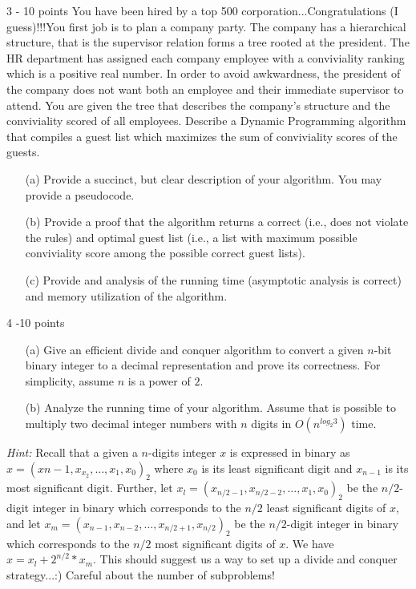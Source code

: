 \documentclass{common/cs157}
\begin{document}
\begin{problem}{3 - 10 points}
You have been hired by a top 500 corporation...Congratulations (I guess)!!!You first job is to plan a company party. The company has a hierarchical structure, that is the supervisor relation forms a tree rooted at the president. The HR department has assigned each company employee with a conviviality ranking which is a positive real number. In order to avoid awkwardness, the president of the company does not want both an employee and their immediate supervisor to attend. You are given the tree that describes the company's structure and the conviviality scored of all employees. Describe a Dynamic Programming algorithm that compiles a guest list which maximizes the sum of conviviality scores of the guests.
\begin{enumerate}
    \item[(a)] Provide a succinct, but clear description of your algorithm. You may provide a pseudocode.
    \item[(b)] Provide a proof that the algorithm returns a correct (i.e., does not violate the rules) and optimal guest list (i.e., a list with maximum possible conviviality score among the possible correct guest lists).
    \item[(c)] Provide and analysis of the running time (asymptotic analysis is correct) and memory utilization of the algorithm.
\end{enumerate}

\end{problem}

\begin{problem}{4 -10 points}
\begin{enumerate}
    \item[(a)]Give an efficient divide and conquer algorithm to convert a given $n$-bit binary integer to a decimal representation and prove its correctness. For simplicity, assume $n$ is a power of $2$.
    \item[(b)] Analyze the running time of your algorithm. Assume that is possible to multiply two decimal integer numbers with $n$ digits in $O(n^{log_2 3})$ time. 
\end{enumerate}

\emph{Hint:} Recall that a given a $n$-digits integer $x$ is expressed in binary as $x=(x{n-1},x_{x_2},\ldots, x_1,x_0)_2$
where $x_0$ is its least significant digit and $x_{n-1}$ is its most significant digit. Further, let $x_l=(x_{n/2-1},x_{n/2-2},\ldots,x_1,x_0)_2$ be the $n/2$-digit integer in binary which corresponds to the $n/2$ least significant digits of $x$, and let $x_m=(x_{n-1},x_{n-2},\ldots,x_{n/2+1},x_{n/2})_2$ be the $n/2$-digit integer in binary which corresponds to the $n/2$ most significant digits of $x$. We have $x=x_l+2^{n/2}*x_m$. This should suggest us a way to set up a divide and conquer strategy...:) Careful about the number of subproblems!
\end{problem}
\end{document}
